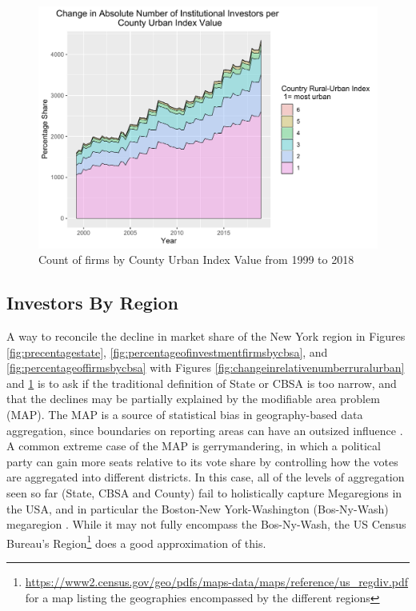 \begin{figure}
	\centering
	\includegraphics[width=1\linewidth]{Figures/ChapterIII/ChangeInAbsoluteNumberRuralUrban}
	\caption[Absolute Numbers of Institutional Investors Over Time by County Urban-Rural Index]{Count of firms by County Urban Index Value from 1999 to 2018}
	\label{fig:changeinabsolutenumberruralurban}
\end{figure}


\subsection{Investors By Region}

A way to reconcile the decline in market share of the New York region in Figures \ref{fig:precentagestate}, \ref{fig:percentageofinvestmentfirmsbycbsa}, and \ref{fig:percentageoffirmsbycbsa}  with Figures \ref{fig:changeinrelativenumberruralurban} and \ref{fig:changeinabsolutenumberruralurban} is to ask if the traditional definition of State or CBSA is too narrow, and that the declines may be partially explained by the modifiable area problem (MAP).  The MAP is a source of statistical bias in geography-based data aggregation, since boundaries on reporting areas can have an outsized influence \citep{Fotheringham1991}.  A common extreme case of the MAP is gerrymandering, in which a political party can gain more seats relative to its vote share by controlling how the votes are aggregated into different districts.  In this case, all of the levels of aggregation seen so far (State, CBSA and County) fail to holistically capture Megaregions in the USA, and in particular the Boston-New York-Washington (Bos-Ny-Wash) megaregion  \citep{lang2007america}. While it may not fully encompass the Bos-Ny-Wash, the US Census Bureau's Region\footnote{\url{https://www2.census.gov/geo/pdfs/maps-data/maps/reference/us_regdiv.pdf} for a map listing the geographies encompassed by the different regions} does a good approximation of this.  

